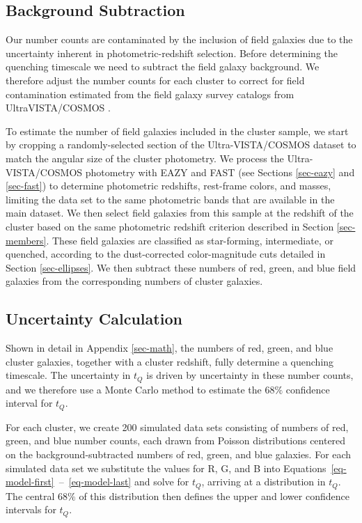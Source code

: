 \subsection{Background Subtraction}\label{sec-bkg}

Our number counts are contaminated by the inclusion of field galaxies due to the uncertainty inherent in photometric-redshift selection.
Before determining the quenching timescale we need to subtract the field galaxy background.
We therefore adjust the number counts for each cluster to correct for field contamination estimated from the field galaxy survey catalogs from UltraVISTA/COSMOS \citep{muzzin2013}.

To estimate the number of field galaxies included in the cluster sample, we start by cropping a randomly-selected section of the Ultra-VISTA/COSMOS dataset to match the angular size of the cluster photometry.
We process the Ultra-VISTA/COSMOS photometry with EAZY and FAST (see Sections \ref{sec-eazy} and \ref{sec-fast}) to determine photometric redshifts, rest-frame colors, and masses, limiting the data set to the same photometric bands that are available in the main dataset.
We then select field galaxies from this sample at the redshift of the cluster based on the same photometric redshift criterion described in Section \ref{sec-members}.
These field galaxies are classified as star-forming, intermediate, or quenched, according to the dust-corrected color-magnitude cuts detailed in Section \ref{sec-ellipses}.
We then subtract these numbers of red, green, and blue field galaxies from the corresponding numbers of cluster galaxies.

\subsection{Uncertainty Calculation}\label{sec-error}

Shown in detail in Appendix \ref{sec-math}, the numbers of red, green, and blue cluster galaxies, together with a cluster redshift, fully determine a quenching timescale.
The uncertainty in $t_Q$ is driven by uncertainty in these number counts, and we therefore use a Monte Carlo method to estimate the $68\%$ confidence interval for $t_Q$.

For each cluster, we create 200 simulated data sets consisting of numbers of red, green, and blue number counts, each drawn from Poisson distributions centered on the background-subtracted numbers of red, green, and blue galaxies.
For each simulated data set we substitute the values for R, G, and B into Equations~\eqref{eq-model-first}~--~\eqref{eq-model-last} and solve for $t_Q$, arriving at a distribution in $t_Q$.
The central $68\%$ of this distribution then defines the upper and lower confidence intervals for $t_Q$.

